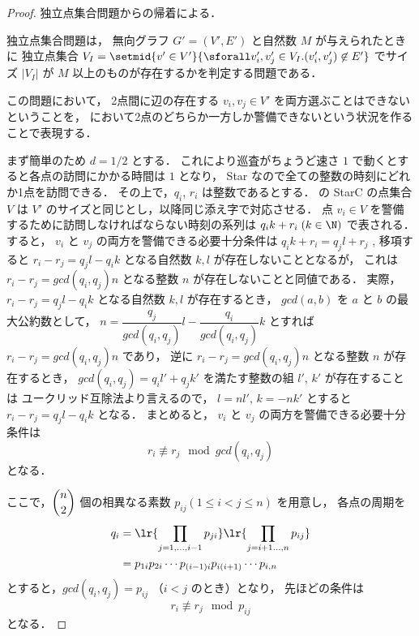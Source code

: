 \begin{proof}
	独立点集合問題からの帰着による．

	独立点集合問題は，
	無向グラフ $G' = (V', E')$ と自然数 $M$ が与えられたときに
	独立点集合
	$V_I = \setmid{ v' \in V' }
	{ \sforall v_i', v_j' \in V_I . (v_i', v_j') \not\in E'}$
	でサイズ $|V_I|$ が $M$ 以上のものが存在するかを判定する問題である．

	この問題において， 2点間に辺の存在する $v_i, v_j \in V'$ を両方選ぶことはできないということを，
	\maxprofit において2点のどちらか一方しか警備できないという状況を作ることで表現する．

	まず簡単のため $d = 1/2$ とする．
	これにより巡査がちょうど速さ $1$ で動くとすると各点の訪問にかかる時間は $1$ となり，
	Star なので全ての整数の時刻にどれか1点を訪問できる．
	その上で，$q_i$, $r_i$ は整数であるとする．
	\maxprofit の StarC の点集合 $V$ は $V'$ のサイズと同じとし，以降同じ添え字で対応させる．
	点 $v_i \in V$ を警備するために訪問しなければならない時刻の系列は
	$q_i k + r_i \; (k \in \N)$ で表される．
	すると， $v_i$ と $v_j$ の両方を警備できる必要十分条件は
	$q_i k + r_i = q_j l + r_j$ , 移項すると
	$r_i - r_j = q_j l - q_i k$ 
	となる自然数 $k, l$ が存在しないこととなるが，
	これは $r_i - r_j = gcd(q_i,q_j) n$ となる整数 $n$ が存在しないことと同値である．
	実際，
	$r_i - r_j = q_j l - q_i k$ となる自然数 $k,l$ が存在するとき，
	$gcd(a,b)$ を $a$ と $b$ の最大公約数として，
	$n = \dfrac{q_j}{gcd(q_i,q_j)} l - \dfrac{q_i}{gcd(q_i,q_j)} k$ とすれば
	$r_i - r_j = gcd(q_i,q_j) n$ であり，
	逆に $r_i - r_j = gcd(q_i,q_j) n$ となる整数 $n$ が存在するとき，
	$gcd(q_i,q_j) = q_i l' + q_j k'$ を満たす整数の組 $l'$, $k'$ が存在することは
	ユークリッド互除法より言えるので， $l = nl'$, $k = -nk'$ とすると
	$r_i - r_j = q_j l - q_i k$ となる．
	まとめると， $v_i$ と $v_j$ の両方を警備できる必要十分条件は
	\begin{equation}
		r_i \not\equiv r_j \mod gcd(q_i, q_j)
	\end{equation}
	となる．

	ここで，$\dbinom{n}{2}$ 個の相異なる素数 $p_{ij} (1\leq i < j \leq n)$ を用意し，
	各点の周期を
	\begin{align*}
		q_i
		&= \lr{\prod_{j = 1, \ldots, i - 1} p_{ji}}
		   \lr{\prod_{j = i + 1 \ldots, n} p_{ij}} \\
		&= p_{1i} p_{2i} \cdots p_{(i - 1)i} p_{i(i + 1)} \cdots p_{i,n}
	\end{align*}
	とすると，$gcd(q_i,q_j) = p_{ij}$ （$i < j$ のとき）となり，
	先ほどの条件は
	\begin{equation}
		r_i \not\equiv r_j \mod p_{ij}
	\end{equation}
	となる．


\end{proof}
